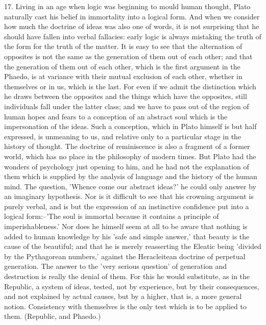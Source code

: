 17. Living in an age when logic was beginning to mould human thought,
Plato naturally cast his belief in immortality into a logical form. And
when we consider how much the doctrine of ideas was also one of words,
it is not surprising that he should have fallen into verbal fallacies:
early logic is always mistaking the truth of the form for the truth of
the matter. It is easy to see that the alternation of opposites is
not the same as the generation of them out of each other; and that the
generation of them out of each other, which is the first argument in
the Phaedo, is at variance with their mutual exclusion of each other,
whether in themselves or in us, which is the last. For even if we admit
the distinction which he draws between the opposites and the things
which have the opposites, still individuals fall under the latter class;
and we have to pass out of the region of human hopes and fears to a
conception of an abstract soul which is the impersonation of the ideas.
Such a conception, which in Plato himself is but half expressed, is
unmeaning to us, and relative only to a particular stage in the history
of thought. The doctrine of reminiscence is also a fragment of a former
world, which has no place in the philosophy of modern times. But Plato
had the wonders of psychology just opening to him, and he had not the
explanation of them which is supplied by the analysis of language and
the history of the human mind. The question, 'Whence come our abstract
ideas?' he could only answer by an imaginary hypothesis. Nor is it
difficult to see that his crowning argument is purely verbal, and is
but the expression of an instinctive confidence put into a logical
form:--'The soul is immortal because it contains a principle of
imperishableness.' Nor does he himself seem at all to be aware that
nothing is added to human knowledge by his 'safe and simple answer,'
that beauty is the cause of the beautiful; and that he is merely
reasserting the Eleatic being 'divided by the Pythagorean numbers,'
against the Heracleitean doctrine of perpetual generation. The answer to
the 'very serious question' of generation and destruction is really
the denial of them. For this he would substitute, as in the Republic, a
system of ideas, tested, not by experience, but by their consequences,
and not explained by actual causes, but by a higher, that is, a more
general notion. Consistency with themselves is the only test which is to
be applied to them. (Republic, and Phaedo.)


